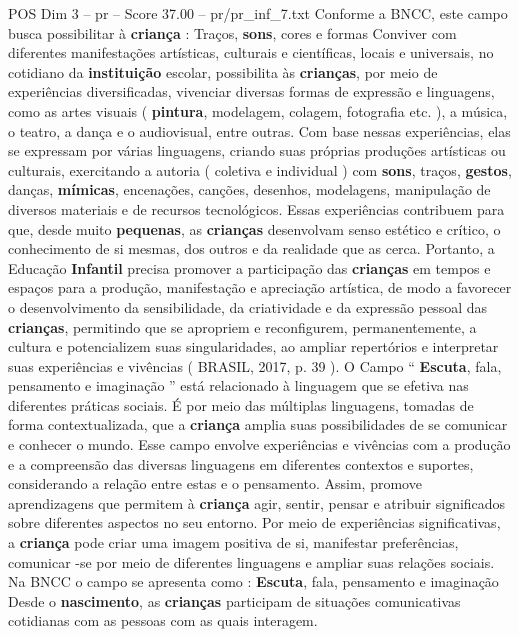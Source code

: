 \begin{textsample}{POS Dim 3 – pr – Score 37.00 – pr/pr\_inf\_7.txt}
Conforme a BNCC, este campo busca possibilitar à \textbf{criança} : Traços, \textbf{sons}, cores e formas Conviver com diferentes manifestações artísticas, culturais e científicas, locais e universais, no cotidiano da \textbf{instituição} escolar, possibilita às \textbf{crianças}, por meio de experiências diversificadas, vivenciar diversas formas de expressão e linguagens, como as artes visuais ( \textbf{pintura}, modelagem, colagem, fotografia etc. ), a música, o teatro, a dança e o audiovisual, entre outras.
Com base nessas experiências, elas se expressam por várias linguagens, criando suas próprias produções artísticas ou culturais, exercitando a autoria ( coletiva e individual ) com \textbf{sons}, traços, \textbf{gestos}, danças, \textbf{mímicas}, encenações, canções, desenhos, modelagens, manipulação de diversos materiais e de recursos tecnológicos.
Essas experiências contribuem para que, desde muito \textbf{pequenas}, as \textbf{crianças} desenvolvam senso estético e crítico, o conhecimento de si mesmas, dos outros e da realidade que as cerca.
Portanto, a Educação \textbf{Infantil} precisa promover a participação das \textbf{crianças} em tempos e espaços para a produção, manifestação e apreciação artística, de modo a favorecer o desenvolvimento da sensibilidade, da criatividade e da expressão pessoal das \textbf{crianças}, permitindo que se apropriem e reconfigurem, permanentemente, a cultura e potencializem suas singularidades, ao ampliar repertórios e interpretar suas experiências e vivências ( BRASIL, 2017, p. 39 ).
O Campo “ \textbf{Escuta}, fala, pensamento e imaginação ” está relacionado à linguagem que se efetiva nas diferentes práticas sociais.
É por meio das múltiplas linguagens, tomadas de forma contextualizada, que a \textbf{criança} amplia suas possibilidades de se comunicar e conhecer o mundo.
Esse campo envolve experiências e vivências com a produção e a compreensão das diversas linguagens em diferentes contextos e suportes, considerando a relação entre estas e o pensamento.
Assim, promove aprendizagens que permitem à \textbf{criança} agir, sentir, pensar e atribuir significados sobre diferentes aspectos no seu entorno.
Por meio de experiências significativas, a \textbf{criança} pode criar uma imagem positiva de si, manifestar preferências, comunicar -se por meio de diferentes linguagens e ampliar suas relações sociais.
Na BNCC o campo se apresenta como : \textbf{Escuta}, fala, pensamento e imaginação Desde o \textbf{nascimento}, as \textbf{crianças} participam de situações comunicativas cotidianas com as pessoas com as quais interagem.

\end{textsample}
